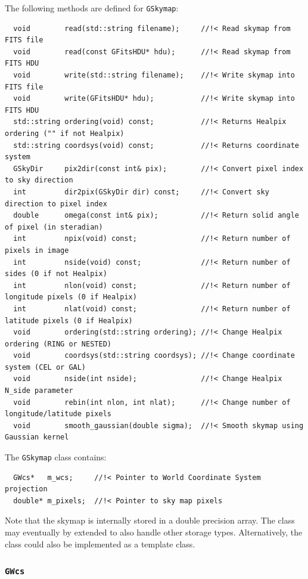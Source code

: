 \documentclass{article}[12pt,a4]
\begin{document}
The following methods are defined for {\tt GSkymap}:
\begin{verbatim}
  void        read(std::string filename);     //!< Read skymap from FITS file
  void        read(const GFitsHDU* hdu);      //!< Read skymap from FITS HDU
  void        write(std::string filename);    //!< Write skymap into FITS file
  void        write(GFitsHDU* hdu);           //!< Write skymap into FITS HDU
  std::string ordering(void) const;           //!< Returns Healpix ordering ("" if not Healpix)
  std::string coordsys(void) const;           //!< Returns coordinate system
  GSkyDir     pix2dir(const int& pix);        //!< Convert pixel index to sky direction
  int         dir2pix(GSkyDir dir) const;     //!< Convert sky direction to pixel index
  double      omega(const int& pix);          //!< Return solid angle of pixel (in steradian)
  int         npix(void) const;               //!< Return number of pixels in image
  int         nside(void) const;              //!< Return number of sides (0 if not Healpix)
  int         nlon(void) const;               //!< Return number of longitude pixels (0 if Healpix)
  int         nlat(void) const;               //!< Return number of latitude pixels (0 if Healpix)
  void        ordering(std::string ordering); //!< Change Healpix ordering (RING or NESTED)
  void        coordsys(std::string coordsys); //!< Change coordinate system (CEL or GAL)
  void        nside(int nside);               //!< Change Healpix N_side parameter
  void        rebin(int nlon, int nlat);      //!< Change number of longitude/latitude pixels
  void        smooth_gaussian(double sigma);  //!< Smooth skymap using Gaussian kernel
\end{verbatim}

The {\tt GSkymap} class contains:
\begin{verbatim}
  GWcs*   m_wcs;     //!< Pointer to World Coordinate System projection
  double* m_pixels;  //!< Pointer to sky map pixels
\end{verbatim}

Note that the skymap is internally stored in a double precision array.
The class may eventually by extended to also handle other storage types.
Alternatively, the class could also be implemented as a template class.


\subsubsection{{\tt GWcs}}
\end{document}
